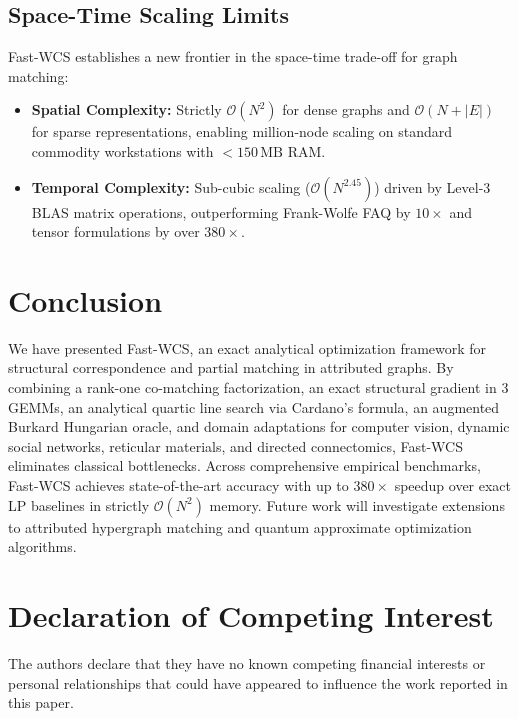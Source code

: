 \documentclass[a4paper,fleqn]{cas-dc}
\theoremstyle{thmstyleone}
\theoremstyle{thmstyletwo}
\theoremstyle{thmstylethree}
\begin{document}
\subsection{Space-Time Scaling Limits}
Fast-WCS establishes a new frontier in the space-time trade-off for graph matching:
\begin{itemize}
    \item \textbf{Spatial Complexity:} Strictly $\mathcal{O}(N^2)$ for dense graphs and $\mathcal{O}(N + |E|)$ for sparse representations, enabling million-node scaling on standard commodity workstations with $< 150\,\text{MB}$ RAM.
    \item \textbf{Temporal Complexity:} Sub-cubic scaling ($\mathcal{O}(N^{2.45})$) driven by Level-3 BLAS matrix operations, outperforming Frank-Wolfe FAQ by $10\times$ and tensor formulations by over $380\times$.
\end{itemize}

\section{Conclusion}
\label{sec:conclusion}

We have presented Fast-WCS, an exact analytical optimization framework for structural correspondence and partial matching in attributed graphs. By combining a rank-one co-matching factorization, an exact structural gradient in 3 GEMMs, an analytical quartic line search via Cardano's formula, an augmented Burkard Hungarian oracle, and domain adaptations for computer vision, dynamic social networks, reticular materials, and directed connectomics, Fast-WCS eliminates classical bottlenecks. Across comprehensive empirical benchmarks, Fast-WCS achieves state-of-the-art accuracy with up to $380\times$ speedup over exact LP baselines in strictly $\mathcal{O}(N^2)$ memory. Future work will investigate extensions to attributed hypergraph matching and quantum approximate optimization algorithms.

\section*{Declaration of Competing Interest}
The authors declare that they have no known competing financial interests or personal relationships that could have appeared to influence the work reported in this paper.
\end{document}
